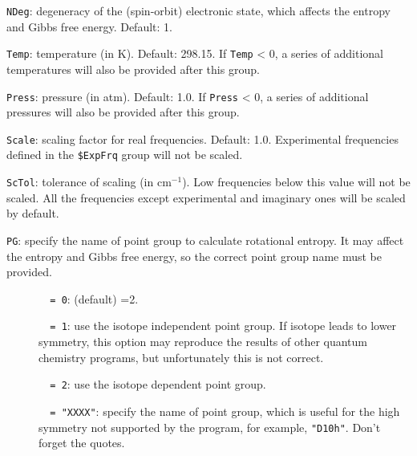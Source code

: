 \documentclass[12pt,english]{extarticle}
\begin{document}
\bigskip{}
\verb|NDeg|: degeneracy of the (spin-orbit) electronic state, which affects the entropy and Gibbs free energy. Default: 1.

\bigskip{}
\verb|Temp|: temperature (in K). Default: 298.15. If \verb|Temp| < 0, a series of additional temperatures will also be provided after this group.

\bigskip{}
\verb|Press|: pressure (in atm). Default: 1.0. If \verb|Press| < 0, a series of additional pressures will also be provided after this group.

\bigskip{}
\verb|Scale|: scaling factor for real frequencies. Default: 1.0. Experimental frequencies defined in the \texttt{\$ExpFrq} group will not be scaled.

\bigskip{}
\verb|ScTol|: tolerance of scaling (in cm$^{-1}$). Low frequencies below this value will not be scaled. All the frequencies except experimental and imaginary ones will be scaled by default.

\bigskip{}
\verb|PG|: specify the name of point group to calculate rotational
entropy. It may affect the entropy and Gibbs free energy, so the correct point group
name must be provided.
\begin{description}
\item[ ]\verb|  = 0|: (default) =2.
\item[ ]\verb|  = 1|: use the isotope independent point group. If isotope leads to lower symmetry, this option may
reproduce the results of other quantum chemistry programs, but unfortunately this is
not correct.
\item[ ]\verb|  = 2|: use the isotope dependent point group.
\item[ ]\verb|  = "XXXX"|: specify the name of point group, which is useful for the high symmetry not supported by the program, for example, \verb|"D10h"|. Don't forget the quotes.
\end{description}
\end{document}
